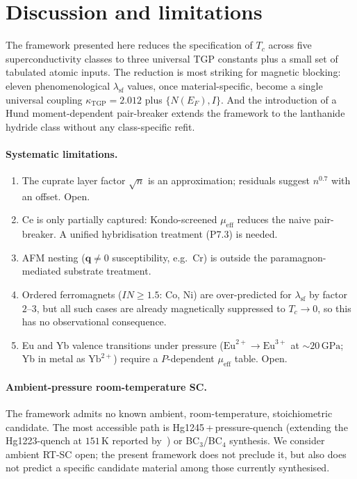 \documentclass[11pt,a4paper]{article}
\newcommand{\lamsf}{\lambda_{\mathrm{sf}}}
\newcommand{\GPa}{\,\mathrm{GPa}}
\begin{document}
\section{Discussion and limitations}\label{sec:discussion}

The framework presented here reduces the specification of $T_{c}$ across
five superconductivity classes to three universal TGP constants plus a
small set of tabulated atomic inputs. The reduction is most striking for
magnetic blocking: eleven phenomenological $\lamsf$ values, once
material-specific, become a single universal coupling
$\kappa_{\mathrm{TGP}}=2.012$ plus $\{N(E_{F}),I\}$. And the introduction
of a Hund moment-dependent pair-breaker extends the framework to the
lanthanide hydride class without any class-specific refit.

\paragraph{Systematic limitations.}
\begin{enumerate}[(L1),nosep]
  \item The cuprate layer factor $\sqrt{n}$ is an approximation;
    residuals suggest $n^{0.7}$ with an offset. Open.
  \item Ce is only partially captured: Kondo-screened
    $\mu_{\mathrm{eff}}$ reduces the naive pair-breaker. A unified
    hybridisation treatment (P7.3) is needed.
  \item AFM nesting ($\mathbf{q}\neq 0$ susceptibility, e.g.\ Cr) is
    outside the paramagnon-mediated substrate treatment.
  \item Ordered ferromagnets ($IN\geq 1.5$: Co, Ni) are over-predicted
    for $\lamsf$ by factor $2\text{--}3$, but all such cases
    are already magnetically suppressed to $T_{c}\to 0$, so this has no
    observational consequence.
  \item Eu and Yb valence transitions under pressure
    ($\mathrm{Eu}^{2+}\!\to\!\mathrm{Eu}^{3+}$ at $\sim\!20\GPa$; Yb in
    metal as $\mathrm{Yb}^{2+}$) require a
    $P$-dependent $\mu_{\mathrm{eff}}$ table. Open.
\end{enumerate}

\paragraph{Ambient-pressure room-temperature SC.}
The framework admits no known ambient, room-temperature, stoichiometric
candidate. The most accessible path is
Hg1245\,+\,pressure-quench (extending the Hg1223-quench at $151$\,K
reported by~\cite{Deng2026}) or BC$_{3}$/BC$_{4}$ synthesis. We
consider ambient RT-SC open; the present framework does not preclude it,
but also does not predict a specific candidate material among those
currently synthesised.
\end{document}
